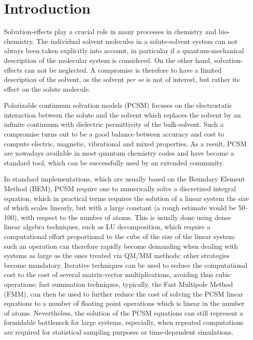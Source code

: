\section{Introduction}\label{sec:intro}

Solvation-effects play a crucial role in many processes in chemistry and bio-chemistry. 
The individual solvent molecules in a solute-solvent system can not always been taken explicitly into account, in particular if a quantum-mechanical description of the molecular system is considered. 
On the other hand, solvation-effects can not be neglected. 
A compromise is therefore to have a limited description of the solvent, as the solvent {\it per se} is not of interest, but rather its effect on the solute molecule.

Polarizable continuum solvation models (PCSM)\cite{ReviewPCM_2005,Cramer:1999wt,Orozco_CR_Solvent00,Klamt:2011we,Mennucci:2012ct,honig1995cla,Roux:1999vp,Klamt_JCS_Cosmo,Chipman_JCP_SSVPE,Chipman_JCP_SSVPE2,Mennucci_JCP_IEF1,Mennucci_JMC_IEF2,Mennucci_JPCB_IEF3, Barone_JCPA_CPCM,Cossi_JCC_CPCM, Lipparini_JCP_VPCM,Lipparini_JCTC_VPCMSCF,Truhlar_JPCB_SMD}  focuses on the electrostatic interaction between the solute and the solvent which replaces the solvent by an infinite continuum with dielectric permittivity of the bulk-solvent.
Such a compromise turns out to be a good balance between accuracy and cost to compute electric, magnetic, vibrational and mixed properties\cite{Mennucci_JPCL_PCM,Mennucci:2012ct,ReviewPCM_2005}. As a result, PCSM are nowadays available in most quantum chemistry codes and have become a standard tool, which can be successfully used by an extended community. 

In standard implementations, which are usually based on the Boundary Element Method\cite{MST,ReviewPCM_1994,ReviewPCM_2005,Scalmani_JCP_CSC,York_JPCA_CSC,
Herbert_JCP_ISWIG} (BEM), PCSM require one to numerically solve a discretized integral equation, which in practical terms requires the solution of a linear system the size of which scales linearly, but with a large constant (a rough estimate would be 50--100), with respect to the number of atoms.  This is usually done using dense linear algebra techniques, such as LU decomposition\cite{Cammi_JCC_Inversion}, which require a computational effort proportional to the cube of the size of the linear system: such an operation can therefore rapidly become demanding when dealing with systems as large as the ones treated via QM/MM methods: other strategies become mandatory. Iterative techniques can be used to reduce the computational cost to the cost of several matrix-vector multiplications\cite{Scalmani_TCA_Iterative}, avoiding thus cubic operations; fast summation techniques, typically, the Fast Multipole Method (FMM)\cite{FMM}, can then be used to further reduce the cost of solving the PCSM linear equations to a number of floating point operations which is linear in the number of atoms. Nevertheless, the solution of the PCSM equations can still represent a formidable bottleneck for large systems\cite{Lipparini_JPCL_ddCOSMO}, especially, when repeated computations are required for statistical sampling purposes or time-dependent simulations.

